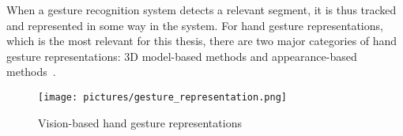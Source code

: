 When a gesture recognition system detects a relevant segment, it is thus tracked and represented in some way in the system. For hand gesture representations, 
which is the most relevant for this thesis, there are two major categories of hand gesture representations: 3D model-based methods and appearance-based methods~\citep{Rautaray2015}.

\begin{figure}%
	\texttt{[image: pictures/gesture\_representation.png]}
	\caption[Vision-based hand gesture representations]{Vision-based hand gesture representations~\citep{Bourke2007} }
	\label{fig:oculus}
\end{figure}


